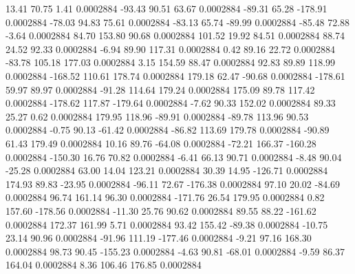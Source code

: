        13.41       70.75        1.41     0.0002884
      -93.43       90.51       63.67     0.0002884
      -89.31       65.28     -178.91     0.0002884
      -78.03       94.83       75.61     0.0002884
      -83.13       65.74      -89.99     0.0002884
      -85.48       72.88       -3.64     0.0002884
       84.70      153.80       90.68     0.0002884
      101.52       19.92       84.51     0.0002884
       88.74       24.52       92.33     0.0002884
       -6.94       89.90      117.31     0.0002884
        0.42       89.16       22.72     0.0002884
      -83.78      105.18      177.03     0.0002884
        3.15      154.59       88.47     0.0002884
       92.83       89.89      118.99     0.0002884
     -168.52      110.61      178.74     0.0002884
      179.18       62.47      -90.68     0.0002884
     -178.61       59.97       89.97     0.0002884
      -91.28      114.64      179.24     0.0002884
      175.09       89.78      117.42     0.0002884
     -178.62      117.87     -179.64     0.0002884
       -7.62       90.33      152.02     0.0002884
       89.33       25.27        0.62     0.0002884
      179.95      118.96      -89.91     0.0002884
      -89.78      113.96       90.53     0.0002884
       -0.75       90.13      -61.42     0.0002884
      -86.82      113.69      179.78     0.0002884
      -90.89       61.43      179.49     0.0002884
       10.16       89.76      -64.08     0.0002884
      -72.21      166.37     -160.28     0.0002884
     -150.30       16.76       70.82     0.0002884
       -6.41       66.13       90.71     0.0002884
       -8.48       90.04      -25.28     0.0002884
       63.00       14.04      123.21     0.0002884
       30.39       14.95     -126.71     0.0002884
      174.93       89.83      -23.95     0.0002884
      -96.11       72.67     -176.38     0.0002884
       97.10       20.02      -84.69     0.0002884
       96.74      161.14       96.30     0.0002884
     -171.76       26.54      179.95     0.0002884
        0.82      157.60     -178.56     0.0002884
      -11.30       25.76       90.62     0.0002884
       89.55       88.22     -161.62     0.0002884
      172.37      161.99        5.71     0.0002884
       93.42      155.42      -89.38     0.0002884
      -10.75       23.14       90.96     0.0002884
      -91.96      111.19     -177.46     0.0002884
       -9.21       97.16      168.30     0.0002884
       98.73       90.45     -155.23     0.0002884
       -4.63       90.81      -68.01     0.0002884
       -9.59       86.37      164.04     0.0002884
        8.36      106.46      176.85     0.0002884
